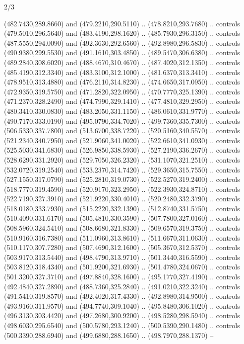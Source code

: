 \begin{flagdescription}{2/3}
\begin{scope}[xshift=\flaglength/2,yshift=\flagwidth/2,scale=\flagwidth/341]
\begin{scope}[xshift=-20mm,yshift=38.3mm,scale=0.1565]
\begin{scope}[y=0.80pt, x=0.80pt, yscale=-1, xscale=1,draw=gold,fill=white]
\begin{scope}[line join=round,line cap=round,line width=1.016\lw]
\begin{scope}[fill]
  (482.7430,289.8660) and (479.2210,290.5110) .. (478.8210,293.7680) .. controls
  (479.5010,296.5640) and (483.4190,298.1620) .. (485.7930,296.3150) .. controls
  (487.5550,294.0090) and (492.3630,292.6560) .. (492.8980,296.5830) .. controls
  (490.9380,299.5530) and (491.1610,303.4850) .. (489.5470,306.6380) .. controls
  (489.2840,308.6020) and (488.4670,310.4670) .. (487.4020,312.1350) .. controls
  (485.4190,312.3340) and (483.3100,312.1000) .. (481.6370,313.3410) .. controls
  (478.9510,313.4880) and (476.2110,314.8230) .. (474.6650,317.0950) .. controls
  (472.9350,319.5750) and (471.2820,322.0950) .. (470.7770,325.1390) .. controls
  (471.2370,328.2490) and (474.7990,329.1410) .. (477.4810,329.2950) .. controls
  (480.3410,330.0830) and (483.2050,331.1150) .. (486.0610,331.9770) .. controls
  (490.7170,333.0190) and (495.0790,334.7020) .. (499.7360,335.7300) .. controls
  (506.5330,337.7800) and (513.6700,338.7220) .. (520.5160,340.5570) .. controls
  (521.2340,340.7950) and (521.9060,341.0020) .. (522.6610,341.0930) .. controls
  (525.5030,341.6830) and (526.9850,338.5930) .. (527.2190,336.2670) .. controls
  (528.6290,331.2920) and (529.7050,326.2320) .. (531.1070,321.2510) .. controls
  (532.0720,319.2540) and (533.2370,314.7420) .. (529.3650,315.7550) .. controls
  (527.1550,317.0790) and (525.2810,319.0730) .. (522.5270,319.2400) .. controls
  (518.7770,319.4590) and (520.9170,323.2950) .. (522.3930,324.8710) .. controls
  (522.7190,327.3910) and (521.9220,330.4010) .. (520.2480,332.3790) .. controls
  (518.0180,333.7930) and (515.2220,332.1390) .. (512.8740,331.5750) .. controls
  (510.4090,331.6170) and (505.4810,330.3590) .. (507.7800,327.0160) .. controls
  (508.5960,324.5410) and (508.6680,321.8330) .. (509.6570,319.3750) .. controls
  (510.9160,316.7380) and (511.0960,313.8610) .. (511.6670,311.0630) .. controls
  (510.1170,307.7280) and (507.4690,312.1600) .. (505.3670,312.5370) .. controls
  (503.9170,313.5440) and (498.4790,313.9710) .. (501.3440,316.5590) .. controls
  (503.8120,318.4340) and (501.9200,321.6930) .. (501.4780,324.0670) .. controls
  (501.3200,327.3710) and (497.8840,328.1600) .. (495.1770,327.4190) .. controls
  (492.4840,327.2890) and (488.7360,325.2840) .. (491.0210,322.3240) .. controls
  (491.5410,319.8570) and (492.4020,317.4330) .. (492.8980,314.9500) .. controls
  (493.9160,311.9570) and (494.7740,309.1040) .. (495.8480,306.1020) .. controls
  (496.3130,303.4420) and (497.2680,300.9200) .. (498.5280,298.5940) .. controls
  (498.6030,295.6540) and (500.5780,293.1240) .. (500.5390,290.1480) .. controls
  (500.3390,288.6940) and (499.6880,288.1650) .. (498.7970,288.1370) --

\end{scope}
\end{scope}
\end{scope}
\end{scope}
\end{scope}
\end{flagdescription}
